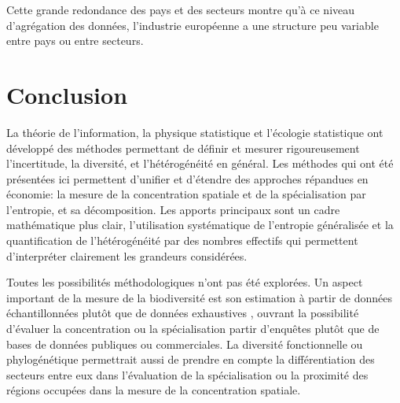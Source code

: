 \documentclass[fleqn,10pt]{ArtEcoFoG} %
\begin{document}
Cette grande redondance des pays et des secteurs montre qu'à ce niveau
d'agrégation des données, l'industrie européenne a une structure peu
variable entre pays ou entre secteurs.

\section{Conclusion}\label{conclusion}

La théorie de l'information, la physique statistique et l'écologie
statistique ont développé des méthodes permettant de définir et mesurer
rigoureusement l'incertitude, la diversité, et l'hétérogénéité en
général. Les méthodes qui ont été présentées ici permettent d'unifier et
d'étendre des approches répandues en économie: la mesure de la
concentration spatiale et de la spécialisation par l'entropie, et sa
décomposition. Les apports principaux sont un cadre mathématique plus
clair, l'utilisation systématique de l'entropie généralisée et la
quantification de l'hétérogénéité par des nombres effectifs qui
permettent d'interpréter clairement les grandeurs considérées.

Toutes les possibilités méthodologiques n'ont pas été explorées. Un
aspect important de la mesure de la biodiversité est son estimation à
partir de données échantillonnées plutôt que de données exhaustives
\citep{Marcon2015a}, ouvrant la possibilité d'évaluer la concentration
ou la spécialisation partir d'enquêtes plutôt que de bases de données
publiques ou commerciales. La diversité fonctionnelle ou phylogénétique
\citep{Marcon2014b} permettrait aussi de prendre en compte la
différentiation des secteurs entre eux dans l'évaluation de la
spécialisation ou la proximité des régions occupées dans la mesure de la
concentration spatiale.



\makeatletter
{}

\makeatother


\end{document}
